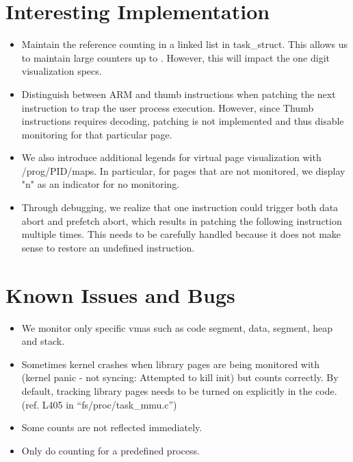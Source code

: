 \documentclass[10pt]{article}
\theoremstyle{plain} \numberwithin{equation}{section}
\theoremstyle{definition}
\newcounter{list}
\begin{document}
\section{Interesting Implementation}
\vspace{-0.2in}
\begin{itemize}
	\item Maintain the reference counting in a linked list in task\_struct. This 
allows us to maintain large counters up to . However, this will impact the one digit 
visualization specs. 
	\vspace{-0.1in}
	\item Distinguish between ARM and thumb instructions when patching the next 
instruction to trap the user process execution. However, since Thumb instructions 
requires decoding, patching is not implemented and thus disable monitoring for that 
particular page. 
	\vspace{-0.1in}
	\item We also introduce additional legends for virtual page visualization with 
/prog/PID/maps. In particular, for pages that are not monitored, we display "n" as an 
indicator for no monitoring. 
	\vspace{-0.1in}
	\item Through debugging, we realize that one instruction could trigger
	both data abort and prefetch abort, which results in patching the
	following instruction multiple times. This needs to be carefully
	handled because it does not make sense to restore an undefined
	instruction.
	\vspace{-0.1in}
\end{itemize}

\section{Known Issues and Bugs}
\vspace{-0.2in}
\begin{itemize}
	\item We monitor only specific vmas such as code segment, data, segment, heap and 
stack. 	    
	\vspace{-0.1in}
	\item Sometimes kernel crashes when library pages are being monitored
	with (kernel panic - not syncing: Attempted to kill init) but counts
	correctly. By default, tracking library pages needs to be turned on
	explicitly in the code. (ref. L405 in ``fs/proc/task\_mmu.c'')
	\vspace{-0.1in}
	\item Some counts are not reflected immediately. 
	\vspace{-0.1in}
	\item Only do counting for a predefined process. 
	\vspace{-0.1in}
    
\end{itemize}
\end{document}
